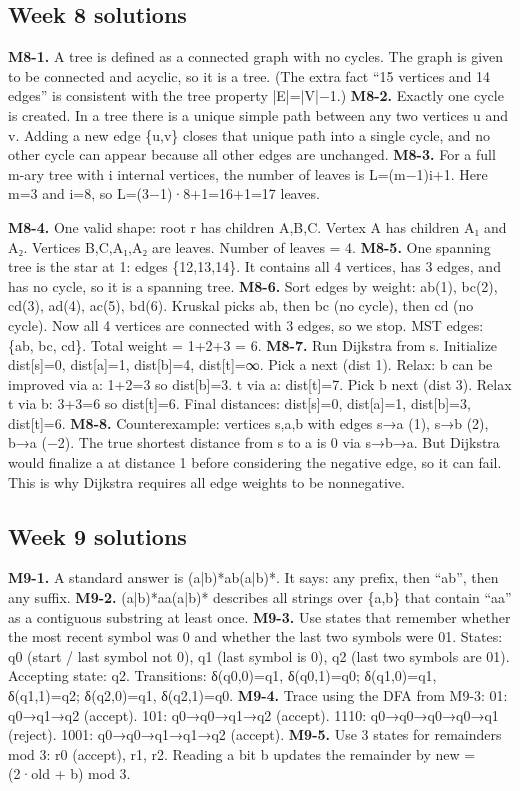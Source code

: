 \documentclass[11pt]{article}
\begin{document}
\subsection{Week 8 solutions}
\textbf{M8-1.} A tree is defined as a connected graph with no cycles. The graph is given to be
connected and acyclic, so it is a tree.
(The extra fact “15 vertices and 14 edges” is consistent with the tree property |E|=|V|−1.)
\textbf{M8-2.} Exactly one cycle is created. In a tree there is a unique simple path between any two
vertices u and v.
Adding a new edge \{u,v\} closes that unique path into a single cycle, and no other cycle
can appear because all other edges are unchanged.
\textbf{M8-3.} For a full m-ary tree with i internal vertices, the number of leaves is L=(m−1)i+1.
Here m=3 and i=8, so L=(3−1)·8+1=16+1=17 leaves.

\textbf{M8-4.} One valid shape: root r has children A,B,C. Vertex A has children A₁ and A₂. Vertices
B,C,A₁,A₂ are leaves.
Number of leaves = 4.
\textbf{M8-5.} One spanning tree is the star at 1: edges \{12,13,14\}.
It contains all 4 vertices, has 3 edges, and has no cycle, so it is a spanning tree.
\textbf{M8-6.} Sort edges by weight: ab(1), bc(2), cd(3), ad(4), ac(5), bd(6).
Kruskal picks ab, then bc (no cycle), then cd (no cycle). Now all 4 vertices are connected
with 3 edges, so we stop.
MST edges: \{ab, bc, cd\}. Total weight = 1+2+3 = 6.
\textbf{M8-7.} Run Dijkstra from s. Initialize dist[s]=0, dist[a]=1, dist[b]=4, dist[t]=∞.
Pick a next (dist 1). Relax: b can be improved via a: 1+2=3 so dist[b]=3. t via a: dist[t]=7.
Pick b next (dist 3). Relax t via b: 3+3=6 so dist[t]=6.
Final distances: dist[s]=0, dist[a]=1, dist[b]=3, dist[t]=6.
\textbf{M8-8.} Counterexample: vertices s,a,b with edges s→a (1), s→b (2), b→a (−2).
The true shortest distance from s to a is 0 via s→b→a. But Dijkstra would finalize a at
distance 1 before considering the negative edge, so it can fail.
This is why Dijkstra requires all edge weights to be nonnegative.
\subsection{Week 9 solutions}
\textbf{M9-1.} A standard answer is (a|b)*ab(a|b)*. It says: any prefix, then “ab”, then any suffix.
\textbf{M9-2.} (a|b)*aa(a|b)* describes all strings over \{a,b\} that contain “aa” as a contiguous
substring at least once.
\textbf{M9-3.} Use states that remember whether the most recent symbol was 0 and whether the
last two symbols were 01.
States: q0 (start / last symbol not 0), q1 (last symbol is 0), q2 (last two symbols are 01).
Accepting state: q2.
Transitions: δ(q0,0)=q1, δ(q0,1)=q0; δ(q1,0)=q1, δ(q1,1)=q2; δ(q2,0)=q1, δ(q2,1)=q0.
\textbf{M9-4.} Trace using the DFA from M9-3:
01: q0→q1→q2 (accept).
101: q0→q0→q1→q2 (accept).
1110: q0→q0→q0→q0→q1 (reject).
1001: q0→q0→q1→q1→q2 (accept).
\textbf{M9-5.} Use 3 states for remainders mod 3: r0 (accept), r1, r2. Reading a bit b updates the
remainder by new = (2·old + b) mod 3.
\end{document}
